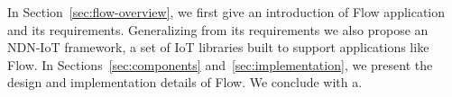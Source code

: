 In Section~\ref{sec:flow-overview}, we first give an introduction of Flow application and its requirements. Generalizing from its requirements we also propose an NDN-IoT framework, a set of IoT libraries built to support applications like Flow. 
In Sections~\ref{sec:components} and~\ref{sec:implementation}, we present the design and implementation details of Flow. 
We conclude with a.
